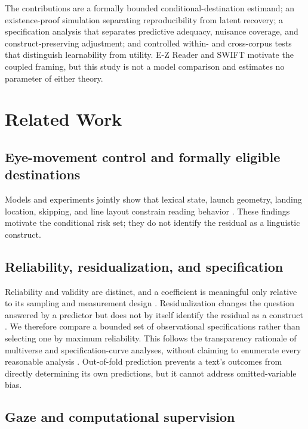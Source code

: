 \documentclass[11pt]{article}
\begin{document}
The contributions are a formally bounded conditional-destination estimand; an existence-proof simulation separating reproducibility from latent recovery; a specification analysis that separates predictive adequacy, nuisance coverage, and construct-preserving adjustment; and controlled within- and cross-corpus tests that distinguish learnability from utility. E-Z Reader and SWIFT motivate the coupled framing, but this study is not a model comparison and estimates no parameter of either theory.

\section{Related Work}

\subsection{Eye-movement control and formally eligible destinations}

Models and experiments jointly show that lexical state, launch geometry, landing location, skipping, and line layout constrain reading behavior \citep{rayner1979,rayner1998,mcconkie1988,vitu1990,reichle2003,engbert2005,drieghe2005,slattery2019}. These findings motivate the conditional risk set; they do not identify the residual as a linguistic construct.

\subsection{Reliability, residualization, and specification}

Reliability and validity are distinct, and a coefficient is meaningful only relative to its sampling and measurement design \citep{hedge2018,rouder2019,parsons2019}. Residualization changes the question answered by a predictor but does not by itself identify the residual as a construct \citep{wurm2014}. We therefore compare a bounded set of observational specifications rather than selecting one by maximum reliability. This follows the transparency rationale of multiverse and specification-curve analyses, without claiming to enumerate every reasonable analysis \citep{steegen2016,simonsohn2020}. Out-of-fold prediction prevents a text's outcomes from directly determining its own predictions, but it cannot address omitted-variable bias.

\subsection{Gaze and computational supervision}
\end{document}
